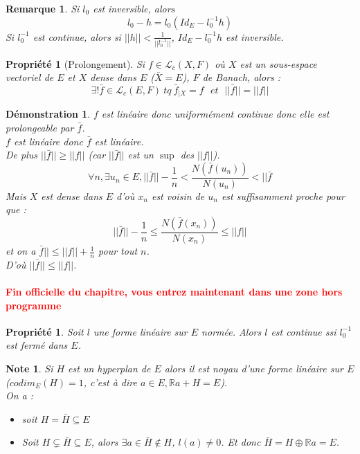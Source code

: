 \documentclass[a4paper, oneside]{report}
\theoremstyle{break}
\newtheorem{propr}[thm]{Propriété}
\newtheorem*{demo}{Démonstration}
\newtheorem{remar}[thm]{Remarque}
\newtheorem{note}[thm]{Note}
\newcommand{\R}{\mathbb{R}}
\renewcommand{\L}{\mathcal{L}}
\newcommand{\sev}{sous-espace vectoriel }
\newcommand{\fracun}[1]{\frac{1}{#1}}
\begin{document}
\begin{remar}
Si $l_0$ est inversible, alors 
$$l_0-h=l_0(Id_E-l_0^{-1}h)$$
Si $l_0^{-1}$ est continue, alors si $||h||<\fracun{||l_0^{-1}||}$, $Id_E-l_0^{-1}h$ est inversible.
\end{remar}

\begin{propr}[Prolongement]
Si $f\in \L_c(X,F)$ où $X$ est un \sev de $E$ et $X$ dense dans $E$ ($\bar{X}=E$), $F$ de Banach, alors :
$$\exists ! \bar{f}\in \L_c(E,F)~tq~\bar{f}_{|X}=f~~~et~~~||\bar{f}||=||f||$$
\end{propr}

\begin{demo}
$f$ est linéaire donc uniformément continue donc elle est prolongeable par $\bar{f}$.\\
$f$ est linéaire donc $\bar{f}$ est linéaire.\\
De plus $||\bar{f}||\geq ||f||$ (car $||\bar{f}||$ est un $\sup$ des $||f||$).\\
$$\forall n, \exists u_n\in E, ||\bar{f}||-\fracun{n}<\frac{N(\bar{f}(u_n))}{N(u_n)}<||\bar{f}$$
Mais $X$ est dense dans $E$ d'où $x_n$ est voisin de $u_n$ est suffisamment proche pour que :
$$||\bar{f}||-\fracun{n}\leq \frac{N(\bar{f}(x_n))}{N(x_n)}\leq ||f||$$
et on a $\bar{f}||\leq ||f||+\fracun{n}$ pour tout $n$.\\
D'où $||\bar{f}||\leq ||f||$.
\end{demo}

\paragraph{\textcolor{red}{Fin officielle du chapitre, vous entrez maintenant dans une zone hors programme}}

\begin{propr}
\label{propr_continuite}
Soit $l$ une forme linéaire sur $E$ normée. Alors $l$ est continue ssi $l_0^{-1}$ est fermé dans $E$.
\end{propr}

\begin{note}
Si $H$ est un hyperplan de $E$ alors il est noyau d'une forme linéaire sur $E$ ($codim_E(H)=1$, c'est à dire $a\in E, \R a+H=E$).\\
On a :
\begin{itemize}
\item soit $H=\bar{H}\subseteq E$
\item Soit $H\subsetneq \bar{H} \subseteq E$, alors $\exists a \in \bar{H}\notin H$, $l(a)\neq 0$. Et donc $\bar{H}=H\oplus \R a=E$.

\end{itemize}
\end{note}
\end{document}
